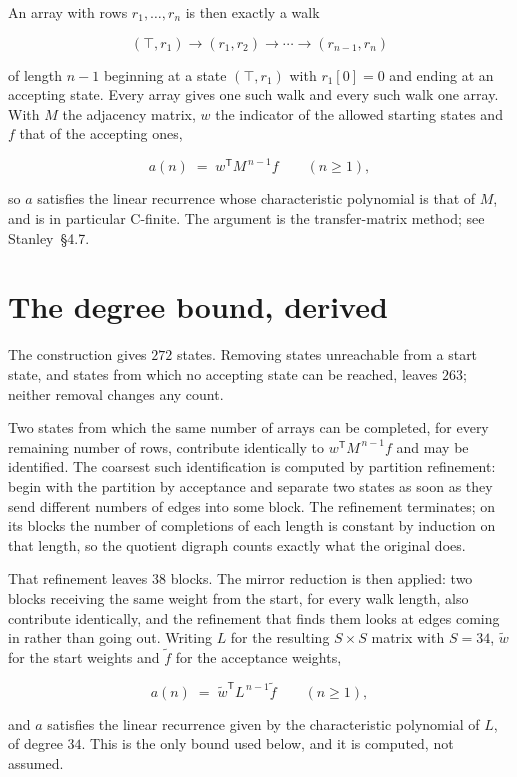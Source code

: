 \documentclass[11pt]{article}
\theoremstyle{definition}
\begin{document}
An array with rows $r_1,\dots,r_n$ is then exactly a walk

\[(\top,r_1) \to (r_1,r_2) \to \cdots \to (r_{n-1},r_n)\]

of length $n-1$ beginning at a state $(\top,r_1)$ with $r_1[0]=0$ and ending at an accepting state. Every array gives one such walk and every such walk one array. With $M$ the adjacency matrix, $w$ the indicator of the allowed starting states and $f$ that of the accepting ones,

\[a(n) \;=\; w^{\mathsf T} M^{\,n-1} f \qquad (n \ge 1),\]

so $a$ satisfies the linear recurrence whose characteristic polynomial is that of $M$, and is in particular C-finite. The argument is the transfer-matrix method; see Stanley~\S4.7.

\section{The degree bound, derived}

The construction gives $272$ states. Removing states unreachable from a start state, and states from which no accepting state can be reached, leaves $263$; neither removal changes any count.

Two states from which the same number of arrays can be completed, for every remaining number of rows, contribute identically to $w^{\mathsf T}M^{\,n-1}f$ and may be identified. The coarsest such identification is computed by partition refinement: begin with the partition by acceptance and separate two states as soon as they send different numbers of edges into some block. The refinement terminates; on its blocks the number of completions of each length is constant by induction on that length, so the quotient digraph counts exactly what the original does.

That refinement leaves $38$ blocks. The mirror reduction is then applied: two blocks receiving the same weight from the start, for every walk length, also contribute identically, and the refinement that finds them looks at edges coming in rather than going out. Writing $L$ for the resulting $S \times S$ matrix with $S = 34$, $\tilde w$ for the start weights and $\tilde f$ for the acceptance weights,

\[a(n) \;=\; \tilde w^{\mathsf T} L^{\,n-1} \tilde f \qquad (n \ge 1),\]

and $a$ satisfies the linear recurrence given by the characteristic polynomial of $L$, of degree $34$. This is the only bound used below, and it is computed, not assumed.
\end{document}
